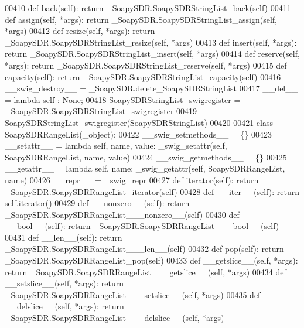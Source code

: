 \begin{DoxyCode}
{{{{00410     \textcolor{keyword}{def }back(self): \textcolor{keywordflow}{return} \_SoapySDR.SoapySDRStringList\_back(self)
00411     \textcolor{keyword}{def }assign(self, *args): \textcolor{keywordflow}{return} \_SoapySDR.SoapySDRStringList\_assign(self, *args)
00412     \textcolor{keyword}{def }resize(self, *args): \textcolor{keywordflow}{return} \_SoapySDR.SoapySDRStringList\_resize(self, *args)
00413     \textcolor{keyword}{def }insert(self, *args): \textcolor{keywordflow}{return} \_SoapySDR.SoapySDRStringList\_insert(self, *args)
00414     \textcolor{keyword}{def }reserve(self, *args): \textcolor{keywordflow}{return} \_SoapySDR.SoapySDRStringList\_reserve(self, *args)
00415     \textcolor{keyword}{def }capacity(self): \textcolor{keywordflow}{return} \_SoapySDR.SoapySDRStringList\_capacity(self)
00416     \_\_swig\_destroy\_\_ = \_SoapySDR.delete\_SoapySDRStringList
00417     \_\_del\_\_ = \textcolor{keyword}{lambda} self : \textcolor{keywordtype}{None};
00418 SoapySDRStringList\_swigregister = \_SoapySDR.SoapySDRStringList\_swigregister
00419 SoapySDRStringList_swigregister(SoapySDRStringList)
00420 
00421 \textcolor{keyword}{class }SoapySDRRangeList(_object):
00422     \_\_swig\_setmethods\_\_ = \{\}
00423     \_\_setattr\_\_ = \textcolor{keyword}{lambda} self, name, value: _swig_setattr(self, SoapySDRRangeList, name, value)
00424     \_\_swig\_getmethods\_\_ = \{\}
00425     \_\_getattr\_\_ = \textcolor{keyword}{lambda} self, name: _swig_getattr(self, SoapySDRRangeList, name)
00426     \_\_repr\_\_ = \_swig\_repr
00427     \textcolor{keyword}{def }iterator(self): \textcolor{keywordflow}{return} \_SoapySDR.SoapySDRRangeList\_iterator(self)
00428     \textcolor{keyword}{def }__iter__(self): \textcolor{keywordflow}{return} self.iterator()
00429     \textcolor{keyword}{def }__nonzero__(self): \textcolor{keywordflow}{return} \_SoapySDR.SoapySDRRangeList\_\_\_nonzero\_\_(self)
00430     \textcolor{keyword}{def }__bool__(self): \textcolor{keywordflow}{return} \_SoapySDR.SoapySDRRangeList\_\_\_bool\_\_(self)
00431     \textcolor{keyword}{def }__len__(self): \textcolor{keywordflow}{return} \_SoapySDR.SoapySDRRangeList\_\_\_len\_\_(self)
00432     \textcolor{keyword}{def }pop(self): \textcolor{keywordflow}{return} \_SoapySDR.SoapySDRRangeList\_pop(self)
00433     \textcolor{keyword}{def }__getslice__(self, *args): \textcolor{keywordflow}{return} \_SoapySDR.SoapySDRRangeList\_\_\_getslice\_\_(self, *args)
00434     \textcolor{keyword}{def }__setslice__(self, *args): \textcolor{keywordflow}{return} \_SoapySDR.SoapySDRRangeList\_\_\_setslice\_\_(self, *args)
00435     \textcolor{keyword}{def }__delslice__(self, *args): \textcolor{keywordflow}{return} \_SoapySDR.SoapySDRRangeList\_\_\_delslice\_\_(self, *args)
}}}}
\end{DoxyCode}
